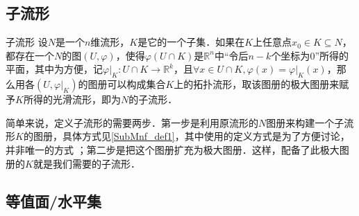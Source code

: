 
\begin{issues}
\issueDraft
\end{issues}


\subsection{子流形}

\begin{definition}{子流形}\label{SubMnf_def1}
设$N$是一个$n$维流形，$K$是它的一个子集．如果在$K$上任意点$x_0\in K\subseteq N$，都存在一个$N$的图$(U, \varphi)$，使得$\varphi (U\cap K)$是$\mathbb{R}^n$中“令后$n-k$个坐标为$0$”所得的平面，其中为方便，记$\varphi|_K:U\cap K\rightarrow\mathbb{R}^k$，且$\forall x\in U\cap K, \varphi(x)=\varphi|_K(x)$，那么用各$(U, \varphi|_K)$的图册可以构成集合$K$上的拓扑流形，取该图册的极大图册来赋予$K$所得的光滑流形，即为$N$的子流形．
\end{definition}

简单来说，定义子流形的需要两步．第一步是利用原流形的$N$图册来构建一个子流形$K$的图册，具体方式见\autoref{SubMnf_def1}，其中使用的定义方式是为了方便讨论，并非唯一的方式 ；第二步是把这个图册扩充为极大图册．这样，配备了此极大图册的$K$就是我们需要的子流形．


\subsection{等值面/水平集}%
